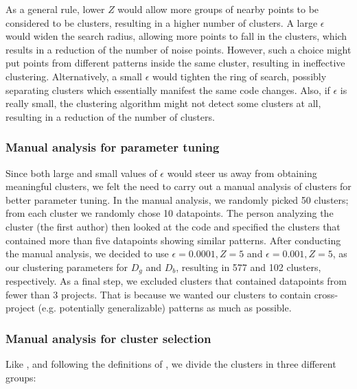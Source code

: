 As a general rule, lower $Z$ would allow more groups of nearby points to be considered to be clusters, resulting in a higher number of clusters. A large $\epsilon$ would widen the search radius, allowing more points to fall in the clusters, which results in a reduction of the number of noise points. However, such a choice might put points from different patterns inside the same cluster, resulting in ineffective clustering. Alternatively, a small $\epsilon$ would tighten the ring of search, possibly separating clusters which essentially manifest the same code changes. Also, if $\epsilon$ is really small, the clustering algorithm might not detect some clusters at all, resulting in a reduction of the number of clusters. 

\subsubsection{\label{sec:manual_analysis_parameter_tuning}Manual analysis for parameter tuning}

Since both large and small values of $\epsilon$ would steer us away from obtaining meaningful clusters, we felt the need to carry out a manual analysis of clusters for better parameter tuning. In the manual analysis, we randomly picked 50 clusters; from each cluster we randomly chose 10 datapoints. The person analyzing the cluster (the first author) then looked at the code and specified the clusters that contained more than five datapoints showing similar patterns. After conducting the manual analysis, we decided to use $\epsilon=0.0001, Z=5$ and $\epsilon=0.001, Z=5$, as our clustering parameters for $D_g$ and $D_b$, resulting in 577 and 102 clusters, respectively. As a final step, we excluded clusters that contained datapoints from fewer than 3 projects. That is because we wanted our clusters to contain cross-project (e.g. potentially generalizable) patterns as much as possible.  

\subsubsection{\label{sec:manual_analysis_cluster_selection}Manual analysis for cluster selection}
Like \cite{yang2022mining}, and following the definitions of \cite{cotroneo2019analyzing}, we divide the clusters in three different groups:

